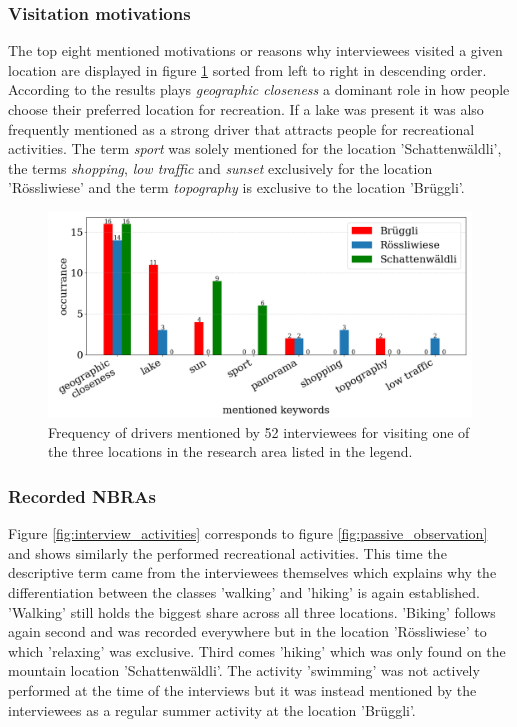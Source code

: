 \subsubsection{Visitation motivations}
The top eight mentioned motivations or reasons why interviewees visited a given location are displayed in figure \ref{fig:interview_visitation_motivation} sorted from left to right in descending order. According to the results plays \textit{geographic closeness} a dominant role in how people choose their preferred location for recreation. If a lake was present it was also frequently mentioned as a strong driver that attracts people for recreational activities. The term \textit{sport} was solely mentioned for the location 'Schattenw\"aldli', the terms \textit{shopping}, \textit{low traffic} and \textit{sunset} exclusively for the location 'R\"ossliwiese' and the term \textit{topography} is exclusive to the location 'Br\"uggli'.

\begin{figure}[h!]
   \centering
   \includegraphics[width=\textwidth]{img/interview_keywords.pdf}
   \caption{Frequency of drivers mentioned by 52 interviewees for visiting one of the three locations in the research area listed in the legend.}
   \label{fig:interview_visitation_motivation}
\end{figure}

\subsubsection{Recorded NBRAs}
Figure \ref{fig:interview_activities} corresponds to figure \ref{fig:passive_observation} and shows similarly the performed recreational activities. This time the descriptive term came from the interviewees themselves which explains why the differentiation between the classes 'walking' and 'hiking' is again established. 'Walking' still holds the biggest share across all three locations. 'Biking' follows again second and was recorded everywhere but in the location 'R\"ossliwiese' to which 'relaxing' was exclusive. Third comes 'hiking' which was only found on the mountain location 'Schattenw\"aldli'. The activity 'swimming' was not actively performed at the time of the interviews but it was instead mentioned by the interviewees as a regular summer activity at the location 'Br\"uggli'.

